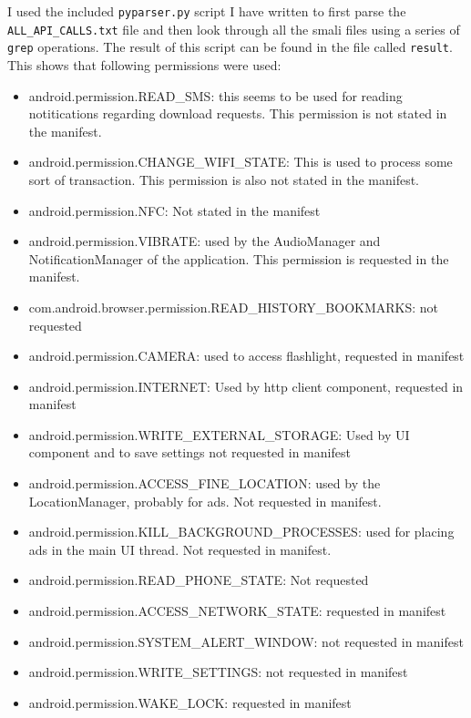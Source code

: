 \documentclass[10pt,a4paper]{article}
\begin{document}
I used the included \texttt{pyparser.py} script I have written to first parse the
\texttt{ALL\_API\_CALLS.txt} file and then look through all the smali files
using a series of \texttt{grep} operations. The result of this script can be
found in the file called \texttt{result}.\\
This shows that following permissions were used:
\begin{itemize}
  \item android.permission.READ\_SMS: this seems to be used for reading
    notitications regarding download requests. This permission is not stated in
    the manifest.
  \item android.permission.CHANGE\_WIFI\_STATE: This is used to process some
    sort of transaction. This permission  is also not
    stated in the manifest.
  \item android.permission.NFC: Not stated in the manifest
  \item android.permission.VIBRATE: used by the AudioManager and
    NotificationManager of the application. This permission is requested in the
    manifest.
  \item com.android.browser.permission.READ\_HISTORY\_BOOKMARKS: not requested
  \item android.permission.CAMERA: used to access flashlight, requested in
    manifest
  \item android.permission.INTERNET: Used by http client component, requested in
    manifest
  \item android.permission.WRITE\_EXTERNAL\_STORAGE: Used by UI component and to
    save settings not requested in manifest
  \item android.permission.ACCESS\_FINE\_LOCATION: used by the LocationManager,
    probably for ads. Not requested in manifest.
  \item android.permission.KILL\_BACKGROUND\_PROCESSES: used for placing ads in
    the main UI thread. Not requested in manifest.
  \item  android.permission.READ\_PHONE\_STATE: Not requested
  \item android.permission.ACCESS\_NETWORK\_STATE: requested in manifest 
  \item android.permission.SYSTEM\_ALERT\_WINDOW: not requested in manifest 

  \item android.permission.WRITE\_SETTINGS: not requested in manifest 

  \item android.permission.WAKE\_LOCK: requested in manifest 
\end{itemize}
\newpage
\end{document}
